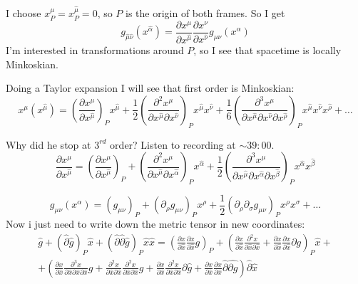 I choose $x^{\mu }_{P}= x^{\hat{\mu }}_{P}=0$, so $P$ is the origin of both frames. So I get
\[
g_{\hat{\mu }\hat{\nu }}\left( x^{\hat{\alpha }} \right) = \frac{\partial x^{\mu }}{\partial x^{\hat{\mu }}} \frac{\partial x^{\nu }}{\partial x^{\hat{\nu }}} g_{\mu \nu }\left( x^{\alpha } \right) 
\]
I'm interested in transformations around $P$, so I see that spacetime is locally Minkoskian.\par
Doing a Taylor expansion I will see that first order is Minkoskian:
\begin{equation}
x^{\mu }\left( x^{\hat{\mu }} \right) = \left( \frac{\partial x^{\mu }}{\partial x^{\hat{\mu }}}  \right)_{P}x^{\hat{\mu }} + \frac{1}{2}\left( \frac{\partial^{2}x^{\mu }}{\partial x^{\hat{\mu }}\partial  x^{\hat{\nu }}}  \right)_{P}x^{\hat{\mu }}x^{\hat{\nu }}+ \frac{1}{6} \left( \frac{\partial^{3}x^{\mu }}{\partial x^{\hat{\mu }}\partial x^{\hat{\nu }}\partial x^{\hat{\rho }} }  \right)_{P} x^{\hat{\mu }}x^{\hat{\nu }}x^{\hat{\rho }}+ \ldots 
\end{equation}

Why did he stop at $3^{rd}$ order? Listen to recording at $\sim 39:00$.
\begin{equation}
\frac{\partial x^{\mu }}{\partial x^{\hat{\mu }}} = \left( \frac{\partial x^{\mu }}{\partial x^{\hat{\mu }}}  \right)_{P} + \left( \frac{\partial^{2}x^{\mu }}{\partial x^{\hat{\mu }}\partial x^{\hat{\alpha }} }  \right)_{P} x^{\hat{\alpha }} +\frac{1}{2} \left( \frac{\partial^{3}x^{\mu }}{\partial x^{\hat{\mu }}\partial x^{\hat{\alpha }} \partial x^{\hat{\beta  }}}  \right)_{P} x^{\hat{\alpha }}x^{\hat{\beta }}
\end{equation}

\begin{equation}
g_{\mu \nu } \left( x^{\alpha } \right) = \left( g_{\mu \nu } \right)_{P} + \left( \partial_{\rho }g_{\mu \nu } \right)_{P} x^{\rho } +\frac{1}{2} \left( \partial_{\rho }\partial _{\sigma } g_{\mu \nu } \right)_{P} x^{\rho }x^{\sigma }+ \ldots 
\end{equation}
Now i just need to write down the metric tensor in new coordinates:
\begin{gather*}
\hat{g} + \left( \hat{\partial }\hat{g} \right)_{P}\hat{x} + \left( \hat{\partial }\hat{\partial }\hat{g} \right)_{P}\hat{x}\hat{x}  = \left( \frac{\partial x}{\partial \hat{x}} \frac{\partial x}{\partial \hat{x}} g \right)_{P} + \left( \frac{\partial x}{\partial \hat{x}}  \frac{\partial^{2}x}{\partial \hat{x} \partial \hat{x}} + \frac{\partial x}{\partial \hat{x}} \frac{\partial x}{\partial \hat{x}} \partial g \right)_{P}\hat{x} + \\
+ \left( \frac{\partial x}{\partial \hat{x}} \frac{\partial^{3}x}{\partial \hat{x} \partial \hat{x} \partial \hat{x}} g + \frac{\partial^{2}x}{\partial \hat{x} \partial \hat{x}} \frac{\partial^{2}x}{\partial \hat{x} \partial \hat{x}} g + \frac{\partial x}{\partial \hat{x}} \frac{\partial^{2}x}{\partial \hat{x} \partial \hat{x}} \partial \hat{g} + \frac{\partial x}{\partial \hat{x}} \frac{\partial x}{\partial \hat{x}} \hat{\partial }\hat{\partial g}   \right) \hat{\partial }\hat{x}
\end{gather*}

